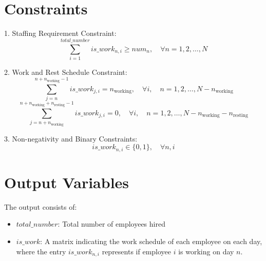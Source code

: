 \documentclass{article}
\begin{document}
\section*{Constraints}
1. Staffing Requirement Constraint:
   \[
   \sum_{i=1}^{total\_number} is\_work_{n,i} \geq num_n, \quad \forall n = 1, 2, \ldots, N
   \]

2. Work and Rest Schedule Constraint:
   \[
   \sum_{j=n}^{n+n_{\text{working}}-1} is\_work_{j,i} = n_{\text{working}}, \quad \forall i, \quad n = 1, 2, \ldots, N - n_{\text{working}}
   \]
   \[
   \sum_{j=n+n_{\text{working}}}^{n+n_{\text{working}}+n_{\text{resting}}-1} is\_work_{j,i} = 0, \quad \forall i, \quad n = 1, 2, \ldots, N - n_{\text{working}} - n_{\text{resting}}
   \]

3. Non-negativity and Binary Constraints:
   \[
   is\_work_{n,i} \in \{0, 1\}, \quad \forall n, i
   \]

\section*{Output Variables}
The output consists of:
\begin{itemize}
    \item \( total\_number \): Total number of employees hired
    \item \( is\_work \): A matrix indicating the work schedule of each employee on each day, where the entry \( is\_work_{n,i} \) represents if employee \( i \) is working on day \( n \).
\end{itemize}
\end{document}
